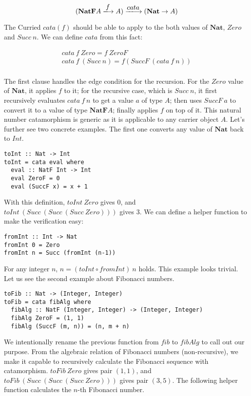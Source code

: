 \documentclass{article}
\begin{document}
\[
(\mathbf{NatF} A \arrowto{f} A) \arrowto{cata} (\mathbf{Nat} \to A)
\]

The Curried $cata(f)$ should be able to apply to the both values of $\mathbf{Nat}$, $Zero$ and $Succ\ n$. We can define $cata$ from this fact:

\[
\begin{array}{l}
cata\ f\ Zero = f\ ZeroF \\
cata\ f\ (Succ\ n) = f (SuccF\ (cata\ f\ n)) \\
\end{array}
\]

The first clause handles the edge condition for the recursion. For the $Zero$ value of $\mathbf{Nat}$, it applies $f$ to it; for the recursive case, which is $Succ\ n$, it first recursively evaluates $cata\ f\ n$ to get a value $a$ of type $A$; then uses $SuccF\ a$ to convert it to a value of type $\mathbf{NatF}A$; finally applies $f$ on top of it. This natural number catamorphism is generic as it is applicable to any carrier object $A$. Let's further see two concrete examples. The first one converts any value of $\mathbf{Nat}$ back to $Int$.

\lstset{frame=single}
\begin{lstlisting}[style=Haskell]
toInt :: Nat -> Int
toInt = cata eval where
  eval :: NatF Int -> Int
  eval ZeroF = 0
  eval (SuccF x) = x + 1
\end{lstlisting}

With this definition, $toInt\ Zero$ gives 0, and $toInt\ (Succ\ (Succ\ (Succ\ Zero)))$ gives 3. We can define a helper function to make the verification easy:

\begin{lstlisting}[style=Haskell]
fromInt :: Int -> Nat
fromInt 0 = Zero
fromInt n = Succ (fromInt (n-1))
\end{lstlisting}

For any integer $n$, $n = (toInt \circ fromInt)\ n$ holds. This example looks trivial. Let us see the second example about Fibonacci numbers.

\begin{lstlisting}[style=Haskell]
toFib :: Nat -> (Integer, Integer)
toFib = cata fibAlg where
  fibAlg :: NatF (Integer, Integer) -> (Integer, Integer)
  fibAlg ZeroF = (1, 1)
  fibAlg (SuccF (m, n)) = (n, m + n)
\end{lstlisting}

We intentionally rename the previous function from $fib$ to $fibAlg$ to call out our purpose. From the algebraic relation of Fibonacci numbers (non-recursive), we make it capable to recursively calculate the Fibonacci sequence with catamorphism. $toFib\ Zero$ gives pair $(1, 1)$, and $toFib\ (Succ\ (Succ\ (Succ\ Zero)))$ gives pair $(3, 5)$. The following helper function calculates the $n$-th Fibonacci number.
\end{document}
